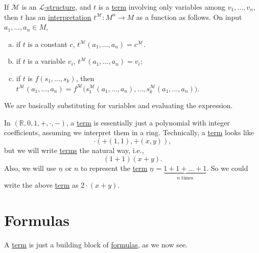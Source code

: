 If \(\mathcal{M}\) is an \hyperref[def:structure]{\(\mathcal{L} \)-structure}, and \(t\) is a \hyperref[def:term]{term} involving only variables among \(v_1, \dots , v_n\), then \(t\) has an \hyperref[not:interpretation]{interpretation} \(t^{\mathcal{M}} \colon M^n \to M\) as a function as follows. On input \(a_1, \dots , a_n \in M\),
\begin{enumerate}[(a)]
	\item if \(t\) is a constant \(c\), \(t^{\mathcal{M} } (a_1, \dots , a_n) = c^{\mathcal{M} }\).
	\item if \(t\) is a variable \(v_i\), \(t^{\mathcal{M} } (a_1, \dots , a_n) = v_i\);
	\item if \(t\) is \(f(s_1, \dots , s_k)\), then \(t^{\mathcal{M} } (a_1, \dots , a_n) = f^{\mathcal{M} } \big(s_1^{\mathcal{M} }(a_1, \dots , a_n), \dots , s_k^{\mathcal{M}}(a_1, \dots , a_n) \big)\).
\end{enumerate}

\begin{intuition}
	We are basically substituting for variables and evaluating the expression.
\end{intuition}

\begin{eg}
	In \((\mathbb{R} , 0, 1, +, \cdot, -)\), a \hyperref[def:term]{term} is essentially just a polynomial with integer coefficients, assuming we interpret them in a ring. Technically, a \hyperref[def:term]{term} looks like
	\[
		\cdot(+(1, 1), +(x, y)),
	\]
	but we will write \hyperref[def:term]{terms} the natural way, i.e.,
	\[
		(1+1) (x+y).
	\]
	Also, we will use \(\underline{n}\) or \(n\) to represent the \hyperref[def:term]{term} \(\underline{n} = \underbrace{1+1+\dots +1}_{n\text{ times}}\). So we could write the above \hyperref[def:term]{term} as \(2\cdot(x+y)\).
\end{eg}

\section{Formulas}
A \hyperref[def:term]{term} is just a building block of \hyperref[def:formula]{formulas}, as we now see.

